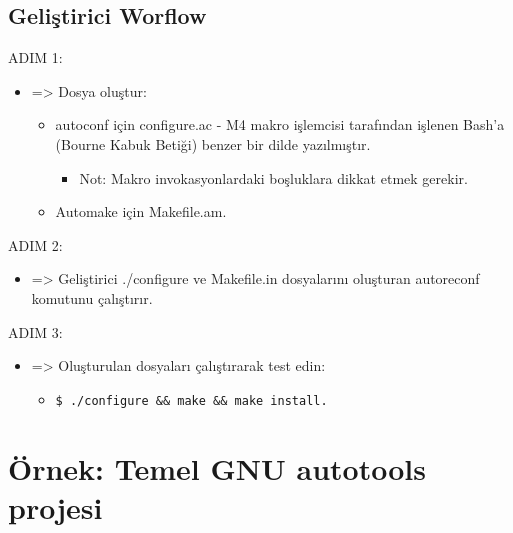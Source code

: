 \documentclass[
]{book}
\providecommand{\tightlist}{%
  \setlength{\itemsep}{0pt}\setlength{\parskip}{0pt}}
\begin{document}
\hypertarget{geliux15ftirici-worflow}{%
\subsection{Geliştirici Worflow}\label{geliux15ftirici-worflow}}

ADIM 1:

\begin{itemize}
\tightlist
\item
  =\textgreater{} Dosya oluştur:

  \begin{itemize}
  \tightlist
  \item
    autoconf için configure.ac - M4 makro işlemcisi tarafından işlenen Bash'a (Bourne Kabuk Betiği) benzer bir dilde yazılmıştır.

    \begin{itemize}
    \tightlist
    \item
      Not: Makro invokasyonlardaki boşluklara dikkat etmek gerekir.
    \end{itemize}
  \item
    Automake için Makefile.am.
  \end{itemize}
\end{itemize}

ADIM 2:

\begin{itemize}
\tightlist
\item
  =\textgreater{} Geliştirici ./configure ve Makefile.in dosyalarını oluşturan autoreconf komutunu çalıştırır.
\end{itemize}

ADIM 3:

\begin{itemize}
\tightlist
\item
  =\textgreater{} Oluşturulan dosyaları çalıştırarak test edin:

  \begin{itemize}
  \tightlist
  \item
    \texttt{\$\ ./configure\ \&\&\ make\ \&\&\ make\ install.}
  \end{itemize}
\end{itemize}

\hypertarget{uxf6rnek-temel-gnu-autotools-projesi}{%
\section{Örnek: Temel GNU autotools projesi}\label{uxf6rnek-temel-gnu-autotools-projesi}}
\end{document}
